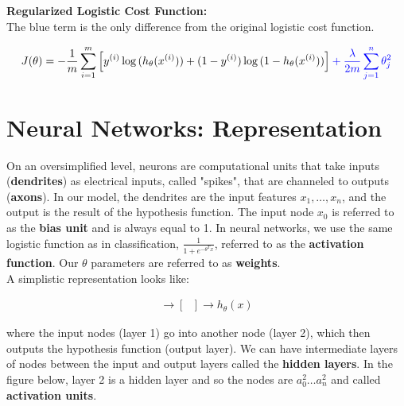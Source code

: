 \documentclass{article}
\begin{document}
        \noindent \textbf{Regularized Logistic Cost Function:} \\
        The blue term is the only difference from the original logistic cost function.

        \begin{equation*}
            J(\theta) = -\frac{1}{m}\sum^m_{i=1}\left[y^{(i)}\log{(h_\theta(x^{(i)}))}
                        + (1-y^{(i)})\log{(1-h_\theta(x^{(i)}))}\right]
                        \color{blue} + \frac{\lambda}{2m}\sum^n_{j=1} \theta^2_j \color{black}
        \end{equation*}



    \pagebreak
    \section{Neural Networks: Representation}
        On an oversimplified level, neurons are computational units that take inputs (\textbf{dendrites}) as
        electrical inputs, called "spikes", that are channeled to outputs (\textbf{axons}). In our model,
        the dendrites are the input features $x_1,\dots, x_n$, and the output is the result of the hypothesis
        function. The input node $x_0$ is referred to as the \textbf{bias unit} and is always equal to 1. In
        neural networks, we use the same logistic function as in classification, $\frac{1}{1+e^{-\theta^T x}}$,
        referred to as the \textbf{activation function}. Our $\theta$ parameters are referred to as
        \textbf{weights}. \\

        \noindent A simplistic representation looks like:

        \begin{align*}
            [x_0 x_1 x_2]\to [\text{ }] \to h_{\theta}(x)
        \end{align*}

        \noindent where the input nodes (layer 1) go into another node (layer 2), which then outputs the
        hypothesis function (output layer). We can have intermediate layers of nodes between the input and
        output layers called the \textbf{hidden layers}. In the figure below, layer 2 is a hidden layer and so
        the nodes are $a^2_0\dots a^2_n$ and called \textbf{activation units}.
\end{document}
